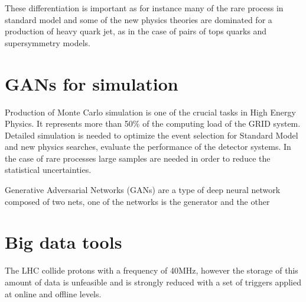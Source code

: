 \documentclass{PoS}
\begin{document}
These
differentiation is important as for instance many of the rare process in standard model and some of the new physics theories are
dominated for a production of heavy quark jet, as in the case of pairs of tops quarks and supersymmetry models.





\section{GANs for simulation}

Production of Monte Carlo simulation is one of the crucial tasks in High Energy Physics. It represents more than 50\% of the computing load of
the GRID system.  Detailed simulation is needed to optimize the event selection for Standard Model and new physics searches, evaluate the
performance of the detector systems. In the case of rare processes large samples are needed in order to reduce the statistical uncertainties.

Generative Adversarial Networks (GANs) are a type of deep neural network composed of two nets, one of the networks is the generator and the other






\section{Big data tools}

The LHC collide protons with a frequency of 40MHz, however the storage of this amount of data is unfeasible and is strongly reduced with a
set of triggers applied at online and offline levels. 





\begin{thebibliography}{99}


\end{thebibliography}
\end{document}
